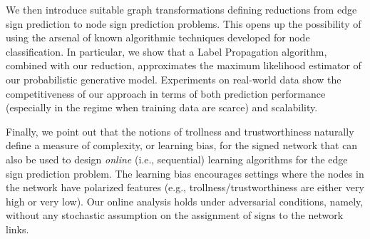 We then introduce suitable graph transformations defining reductions from edge sign prediction to
node sign prediction problems. This opens up the possibility of using the arsenal of known
algorithmic techniques developed for node classification. In particular, we show that a Label
Propagation algorithm, combined with our reduction, approximates the maximum likelihood estimator
of our probabilistic generative model. Experiments on real-world data show the competitiveness of
our approach in terms of both prediction performance (especially in the regime when training data
are scarce) and scalability.

Finally, we point out that the notions of trollness and trustworthiness naturally define a measure
of complexity, or learning bias, for the signed network that can also be used to design
\emph{online} (i.e., sequential) learning algorithms for the edge sign prediction problem. The
learning bias encourages settings where the nodes in the network have polarized features (e.g.,
trollness/trustworthiness are either very high or very low). Our online analysis holds under
adversarial conditions, namely, without any stochastic assumption on the assignment of signs to the
network links.


